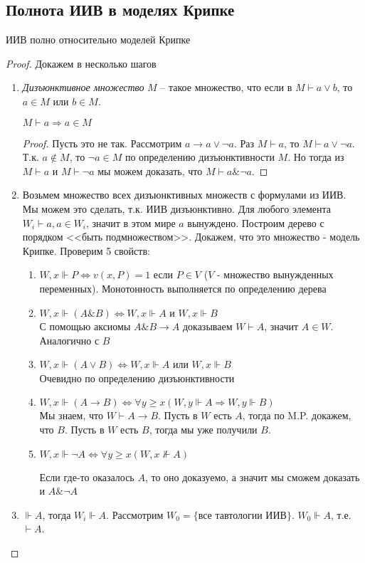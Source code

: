 \subsection{Полнота ИИВ в моделях Крипке}
\label{sec-6-4}
\begin{theorem}
ИИВ полно относительно моделей Крипке
\end{theorem}
\begin{proof}
Докажем в несколько шагов
\begin{enumerate}
\item \emph{Дизъюнктивное множество} $M$ -- такое множество, что если в $M \vdash a \vee b$, то $a \in M$ или $b \in M$.
\begin{lemma}
$M \vdash a \Rightarrow a \in M$
\end{lemma}
\begin{proof}
Пусть это не так. Рассмотрим $a \rightarrow a \vee \neg a$. Раз $M \vdash a$, то $M \vdash a \vee \neg a$. Т.к. $a \notin M$, то $\neg a \in M$ по определению дизъюнктивности $M$. Но тогда из $M \vdash a$ и $M \vdash \neg a$ мы можем доказать, что $M \vdash a \& \neg a$.
\end{proof}
\item Возьмем множество всех дизъюнктивных множеств с формулами из ИИВ. Мы можем это сделать, т.к. ИИВ дизъюнктивно. Для любого элемента $W_{i} \vdash a, a \in W_{i}$, значит в этом мире $a$ вынуждено. Построим дерево с порядком <<быть подмножеством>>. Докажем, что это множество - модель Крипке. Проверим 5 свойств:
\begin{enumerate}
\item $W, x \Vdash P \Leftrightarrow v(x, P) = 1$ если $P \in V$ ($V$ - множество вынужденных переменных). Монотонность выполняется по определению дерева
\item $W, x \Vdash (A \& B) \Leftrightarrow W, x \Vdash A$ и $W, x \Vdash B$\\
С помощью аксиомы $A \& B \rightarrow A$ доказываем $W \vdash A$, значит $A \in W$. Аналогично с $B$ 
\item $W, x \Vdash (A \vee B) \Leftrightarrow W, x \Vdash A$ или $W, x \Vdash B$\\
Очевидно по определению дизъюнктивности
\item $W, x \Vdash (A \rightarrow B) \Leftrightarrow \forall y \geq x (W, y \Vdash A \Rightarrow W, y \Vdash B)$\\
Мы знаем, что $W \vdash A \rightarrow B$. Пусть в $W$ есть $A$, тогда по M.P. докажем, что $B$. Пусть в $W$ есть $B$, тогда мы уже получили $B$.
\item $W, x \Vdash \neg A \Leftrightarrow \forall y \geq x (W, x \nVdash A)$

Если где-то оказалось $A$, то оно доказуемо, а значит мы сможем доказать и $A \& \neg A$ 
\end{enumerate}
\item $\Vdash A$, тогда $W_{i} \Vdash A$. Рассмотрим $W_{0} = \lbrace$все тавтологии ИИВ$\rbrace$. $W_{0} \Vdash A$, т.е. $\vdash A$.
\end{enumerate}
\end{proof}

